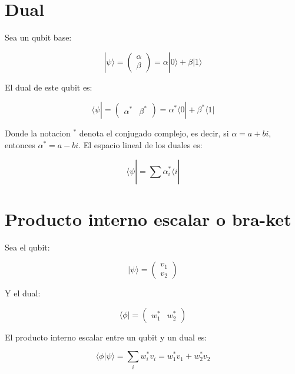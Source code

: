 \documentclass[11pt]{article}
\begin{document}
\section{Dual}

Sea un qubit base:

\begin{equation}
    |\psi\rangle = \begin{pmatrix} \alpha \\ \beta \end{pmatrix} = \alpha |0\rangle + \beta |1\rangle
\end{equation}

El dual de este qubit es:

\begin{equation}
    \langle \psi | = \begin{pmatrix} \alpha^* & \beta^* \end{pmatrix} = \alpha^* \langle 0| + \beta^* \langle 1|
\end{equation}

Donde la notacion $^*$ denota el conjugado complejo, es decir, si $\alpha = a + bi$, entonces $\alpha^* = a - bi$. El espacio lineal de los duales es:

\begin{equation}
    \langle \psi | = \sum_{}^{} \alpha_i^* \langle i |
\end{equation}

\section{Producto interno escalar o bra-ket}

Sea el qubit:

\begin{equation}
    |\psi\rangle = \begin{pmatrix} v_1 \\ v_2 \end{pmatrix}
\end{equation}

Y el dual:

\begin{equation}
    \langle \phi | = \begin{pmatrix} w_1^* & w_2^* \end{pmatrix}
\end{equation}

El producto interno escalar entre un qubit y un dual es:

\begin{equation}
    \langle \phi | \psi \rangle = \sum_{i} w_i^* v_i = w_1^* v_1 + w_2^* v_2
\end{equation}
\end{document}
